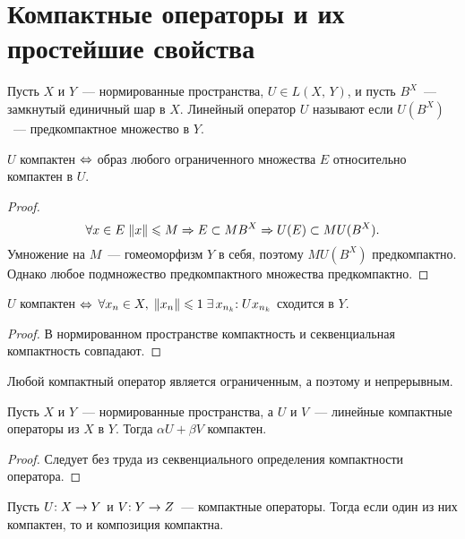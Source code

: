 \documentclass{notes}
\begin{document}
\section{Компактные операторы и их простейшие свойства}

	\begin{de}
		Пусть $X$ и $Y$~--- нормированные пространства, $U \in L(X, \, Y)$, и пусть $B^X$~--- замкнутый единичный шар в $X$. Линейный оператор $U$ называют  если $U(B^X)$~--- предкомпактное множество в $Y$.
	\end{de}

	\begin{st}
		$U$ компактен $\Leftrightarrow$ образ любого ограниченного множества $E$ относительно компактен в $U$.
		\begin{proof}
			\[
				\forall x \in E \; \|x\| \leqslant M \Rightarrow E \subset MB^X \Rightarrow U(E) \subset M U(B^X).
			\]
			Умножение на $M$~--- гомеоморфизм $Y$ в себя, поэтому $MU(B^X)$ предкомпактно. Однако любое подмножество предкомпактного множества предкомпактно.
		\end{proof}
	\end{st}

	\begin{st}
		$U$ компактен $\Leftrightarrow$ $\forall x_n \in X, \; \|x_n\| \leqslant 1 \; \exists \, x_{n_k}\text{\text{:}} \; Ux_{n_k}$ сходится в $Y$.
		\begin{proof}
			В нормированном пространстве компактность и секвенциальная компактность совпадают. 
		\end{proof}
	\end{st}

	\begin{rem}
		Любой компактный оператор является ограниченным, а поэтому и непрерывным.
	\end{rem}

	\begin{thm}
		Пусть $X$ и $Y$~--- нормированные пространства, а $U$ и $V$~--- линейные компактные операторы из $X$ в $Y$. Тогда $\alpha U + \beta V$ компактен.
		\begin{proof}
			Следует без труда из секвенциального определения компактности оператора.
		\end{proof}
	\end{thm}

	\begin{thm}
		Пусть $U\text{\text{:}} \; X \to Y$ и $V \text{\text{:}} \; Y \to Z$~--- компактные операторы. Тогда если один из них компактен, то и композиция компактна.
	\end{thm}
\end{document}
